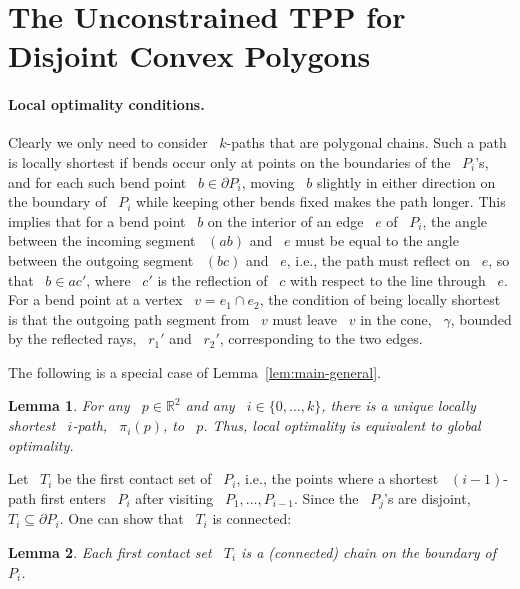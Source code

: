 \documentclass[11pt]{article}
\newtheorem{lemma}{Lemma}
\begin{document}
\section{The Unconstrained TPP for Disjoint Convex Polygons}
\label{sec:unconstrained}

\paragraph{Local optimality conditions.}
Clearly we only need to consider ~\(k\)-paths that are polygonal chains.
Such a path is locally shortest if bends occur only at points on the boundaries of the ~\(P_i\)'s, and for each such bend point ~\(b \in \partial P_i\), moving ~\(b\) slightly in either direction on the boundary of ~\(P_i\) while keeping other bends fixed makes the path longer.
This implies that for a bend point ~\(b\) on the interior of an edge ~\(e\) of ~\(P_i\), the angle between the incoming segment ~\((ab)\) and ~\(e\) must be equal to the angle between the outgoing segment ~\((bc)\) and ~\(e\), i.e., the path must reflect on ~\(e\), so that ~\(b \in ac'\), where ~\(c'\) is the reflection of ~\(c\) with respect to the line through ~\(e\).
For a bend point at a vertex ~\(v = e_1 \cap e_2\), the condition of being locally shortest is that the outgoing path segment from ~\(v\) must leave ~\(v\) in the cone, ~\(\gamma\), bounded by the reflected rays, ~\(r_1'\) and ~\(r_2'\), corresponding to the two edges.

The following is a special case of Lemma~\ref{lem:main-general}.

\begin{lemma}
\label{lem:local-global-basic}
For any ~\(p \in \mathbb{R}^2\) and any ~\(i \in \{0, \ldots, k\}\), there is a unique locally shortest ~\(i\)-path, ~\(\pi_i(p)\), to ~\(p\). Thus, local optimality is equivalent to global optimality.
\end{lemma}

Let ~\(T_i\) be the first contact set of ~\(P_i\), i.e., the points where a shortest ~\((i-1)\)-path first enters ~\(P_i\) after visiting ~\(P_1, \ldots, P_{i-1}\).
Since the ~\(P_j\)'s are disjoint, ~\(T_i \subseteq \partial P_i\).
One can show that ~\(T_i\) is connected:

\begin{lemma}
Each first contact set ~\(T_i\) is a (connected) chain on the boundary of ~\(P_i\).
\end{lemma}
\end{document}
